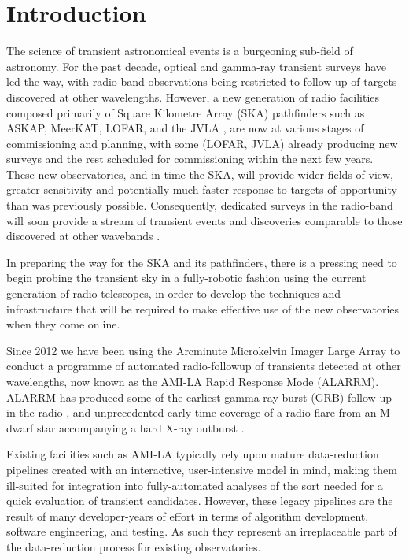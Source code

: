 \documentclass[5p,authoryear]{elsarticle}
\begin{document}
\section{Introduction}
\label{sec:intro}
The science of transient astronomical events is a burgeoning sub-field of astronomy. 
For the past decade, optical and gamma-ray transient surveys have led the way, with radio-band observations being restricted to follow-up of targets discovered at other wavelengths.
However, a new generation of radio facilities composed primarily of Square Kilometre Array (SKA) pathfinders such as ASKAP, MeerKAT, LOFAR, and the JVLA \citep{Norris2013}, are now at various stages of commissioning and planning, with some (LOFAR, JVLA) already producing new surveys and the rest scheduled for commissioning within the next few years.
These new observatories, and in time the SKA, will provide wider fields of view, 
greater sensitivity and potentially much faster response to targets of opportunity than was previously possible. 
Consequently, dedicated surveys in the radio-band will soon provide a stream of transient events and discoveries comparable to those discovered at other wavebands \citep{Burlon2015,Corbel2015,Macquart2015,Stappers2013}.

In preparing the way for the SKA and its pathfinders, there is a pressing
need to begin probing the transient sky in a fully-robotic fashion 
using the current generation of radio telescopes, in order to develop the 
techniques and infrastructure that will be required to make effective use of the
new observatories when they come online.  

Since 2012 we have been using the Arcminute Microkelvin Imager Large Array \citep[AMI-LA,][]{Zwart2008} to conduct a programme of automated radio-followup of transients detected at other wavelengths, now known as the AMI-LA Rapid Response Mode (ALARRM).
ALARRM has produced some of the earliest 
gamma-ray burst (GRB) follow-up in the radio \citep{Staley2013,Anderson2014},
and unprecedented early-time coverage of a radio-flare from an M-dwarf
star accompanying a hard X-ray outburst \citep{Fender2015}.

Existing facilities such as AMI-LA typically rely upon mature data-reduction pipelines created with an interactive, user-intensive model in mind, making them ill-suited for integration into fully-automated analyses of the sort needed for a quick evaluation of transient candidates. 
However, these legacy pipelines are the result of many developer-years of effort in terms of algorithm development, software engineering, and testing.
As such they represent an irreplaceable part of the data-reduction process for existing observatories. 
\end{document}

